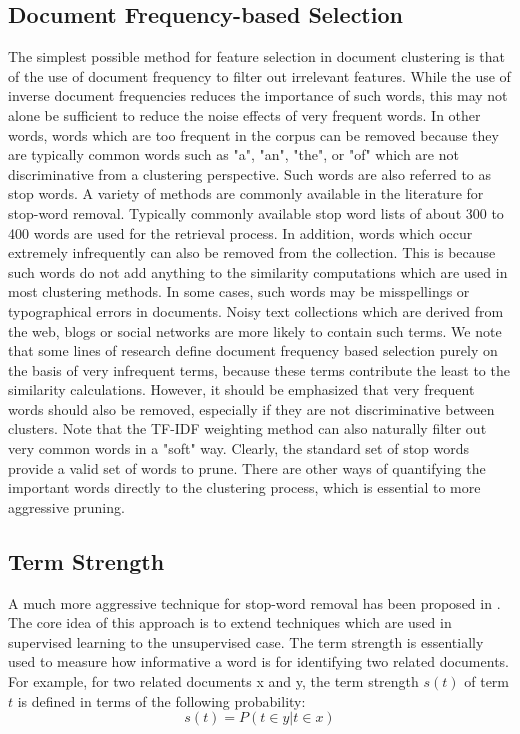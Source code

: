 \subsection{Document Frequency-based Selection}
The simplest possible method for feature selection in document clustering is that of the use of document frequency to filter out irrelevant features. While the use of inverse document frequencies reduces the importance of such words, this may not alone be sufficient to reduce the noise effects of very frequent words. In other words, words which are too frequent in the corpus can be removed because they are typically common words such as "a", "an", "the", or "of" which are not discriminative from a clustering perspective. Such words are also referred to as stop words. A variety of methods are commonly available in the literature for stop-word removal. Typically commonly available stop word lists of about 300 to 400 words are used for the retrieval process. In addition, words which occur extremely infrequently can also be removed from the collection. This is because such words do not add anything to the similarity computations which are used in most clustering methods. In some cases, such words may be misspellings or typographical errors in documents. Noisy text collections which are derived from the web, blogs or social networks are more likely to contain such terms. We note that some lines of research define document frequency based selection purely on the basis of very infrequent terms, because these terms contribute the least to the similarity calculations. However, it should be emphasized that very frequent words should also be removed, especially if they are not discriminative between clusters. Note that the TF-IDF weighting method can also naturally filter out very common words in a "soft" way. Clearly, the standard set of stop words provide a valid set of words to prune. There are other ways of quantifying the important words directly to the clustering process, which is essential to more aggressive pruning.

\subsection{Term Strength}
A much more aggressive technique for stop-word removal has been proposed in \cite{Wilbur1992}. The core idea of this approach is to extend techniques which are used in supervised learning to the unsupervised case. The term strength is essentially used to measure how informative a word is for identifying two related documents. For example, for two related documents x and y, the term strength $s(t)$ of term $t$ is defined in terms of the following probability:
\[
    s(t) = P(t \in y | t \in x)
    \label{eq:probTermStrength} \tag{233}
\]

